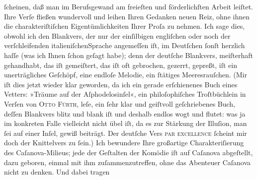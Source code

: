 \begin{ledgroupsized}[t]{13cm}
               ſcheinen, daß man im Berufsgewand am freieſten und förderlichſten Arbeit leiſtet.
               Ihre Verſe fließen wundervoll und leihen Ihren Gedanken neuen Reiz, ohne ihnen die
               charakteriſtiſchen Eigentümlichkeiten Ihrer Proſa zu nehmen. Ich sage dies, obwohl
               ich den Blankvers, der nur der einſilbigen engliſchen oder noch der verſchleifenden italieniſchenSprache angemeſſen iſt, im Deutſchen ſonſt herzlich
               haſſe (was ich Ihnen ſchon geſagt habe); denn der deutſche Blankvers, mei{\pb}ſterhaft gehandhabt, das iſt gemeiſtert,
               das iſt oft gebrochen, gezerrt, gepreßt, iſt ein unerträgliches Geſchöpf, eine
               endloſe Melodie, ein ſtätiges Meeresrauſchen. (Mir iſt dies jetzt wieder klar
               geworden, da ich ein gerade erſchienenes Buch eines Vetters: »Träume auf der Aſphodelosinſel«, ein philoſophiſches
               Troſtbüchlein in Verſen von \textsc{Otto Fürth}, leſe, ein ſehr klar und geiſtvoll geſchriebenes Buch, deſſen Blankvers blitz
               und blank iſt und deshalb endlos wogt und flutet: was ja im konkreten Falle
               vielleicht nicht übel iſt, da es zur Stärkung der Illuſion, man ſei auf einer Inſel,
               gewiß beiträgt. Der deutſche Vers \textsc{par excellence}{ }ſcheint mir doch der Knittelvers zu ſein.)\pend
           \pstart
           Ich bewundere Ihre großartige Charakteriſierung des Caſanova-Milieus; jede der Geſtalten der Komödie iſt auf
                  Caſanova abgeſtellt, dazu
               geboren, einmal mit ihm zuſammenzutreffen, ohne das Abenteuer Caſanova nicht zu denken. Und dabei tragen

\end{ledgroupsized}

